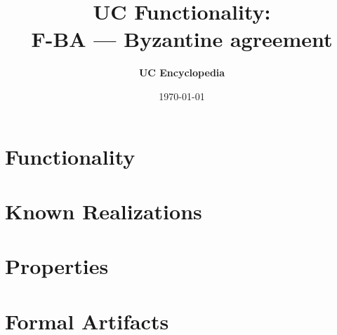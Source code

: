 \documentclass[11pt,a4paper]{article}
\title{\textbf{\Large UC Functionality:}\\[0.2em] \Large F-BA --- Byzantine agreement}
\author{\textbf{UC Encyclopedia}}
\date{\today}
\newtheorem{functionality}{Functionality}
\begin{document}
\maketitle

\begin{abstract}
\end{abstract}

\section{Functionality}

%

\section{Known Realizations}


\section{Properties}


\section{Formal Artifacts}

\end{document}
